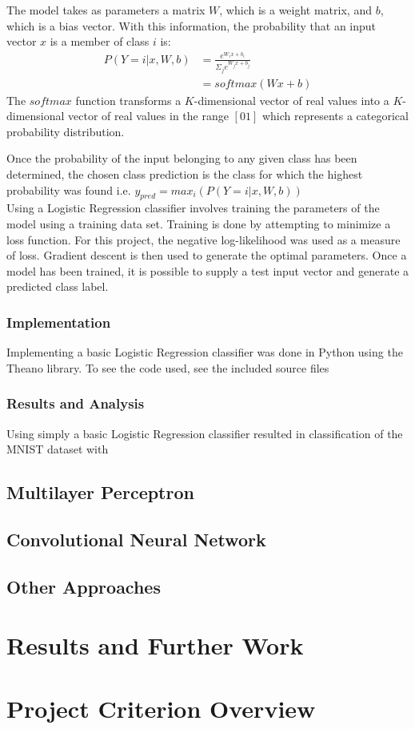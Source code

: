 \documentclass{article}
\begin{document}
  The model takes as parameters a matrix $W$, which is a weight matrix, and $b$, which is a bias vector. With this information, the probability that an input vector 
  $x$ is a member of class $i$ is: \\
  \begin{align*}
  P(Y=i|x,W,b) &= \frac{e^{W_{i}x + b_{i}}}{\Sigma_{j}e^{W_{j}x + b_{j}}} \\
               &= softmax(Wx+b)
  \end{align*}
  The $softmax$ function transforms a $K$-dimensional vector of real values into a $K$-dimensional vector of real values in the range $[0 1]$ which represents a
  categorical probability distribution.
  
  Once the probability of the input belonging to any given class has been determined, the chosen class prediction is the class for which the highest probability
  was found i.e. $y_{pred} = max_{i}(P(Y=i|x,W,b))$ \\
  
  Using a Logistic Regression classifier involves training the parameters of the model using a training data set. Training is done by attempting to minimize a loss
  function. For this project, the negative log-likelihood was used as a measure of loss. Gradient descent is then used to generate the optimal parameters. Once a 
  model has been trained, it is possible to supply a test input vector and generate a predicted class label.
  
  \subsubsection{Implementation}
  
  Implementing a basic Logistic Regression classifier was done in Python using the Theano library. To see the code used, see the included source files

  \subsubsection{Results and Analysis}
  
  Using simply a basic Logistic Regression classifier resulted in classification of the MNIST dataset with  

\subsection{Multilayer Perceptron}

\subsection{Convolutional Neural Network}

\subsection{Other Approaches}

\section{Results and Further Work}

\section{Project Criterion Overview}
\end{document}
